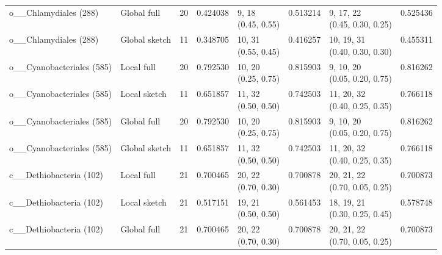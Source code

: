 \begin{longtable}{lllr lrlr}
o\_\_Chlamydiales (288) & Global full & 20 & 0.424038 & \shortstack[l]{9, 18\\(0.45, 0.55)} & 0.513214 & \shortstack[l]{9, 17, 22\\(0.45, 0.30, 0.25)} & 0.525436 \\
o\_\_Chlamydiales (288) & Global sketch & 11 & 0.348705 & \shortstack[l]{10, 31\\(0.55, 0.45)} & 0.416257 & \shortstack[l]{10, 19, 31\\(0.40, 0.30, 0.30)} & 0.455311 \\
o\_\_Cyanobacteriales (585) & Local full & 20 & 0.792530 & \shortstack[l]{10, 20\\(0.25, 0.75)} & 0.815903 & \shortstack[l]{9, 10, 20\\(0.05, 0.20, 0.75)} & 0.816262 \\
o\_\_Cyanobacteriales (585) & Local sketch & 11 & 0.651857 & \shortstack[l]{11, 32\\(0.50, 0.50)} & 0.742503 & \shortstack[l]{11, 20, 32\\(0.40, 0.25, 0.35)} & 0.766118 \\
o\_\_Cyanobacteriales (585) & Global full & 20 & 0.792530 & \shortstack[l]{10, 20\\(0.25, 0.75)} & 0.815903 & \shortstack[l]{9, 10, 20\\(0.05, 0.20, 0.75)} & 0.816262 \\
o\_\_Cyanobacteriales (585) & Global sketch & 11 & 0.651857 & \shortstack[l]{11, 32\\(0.50, 0.50)} & 0.742503 & \shortstack[l]{11, 20, 32\\(0.40, 0.25, 0.35)} & 0.766118 \\
c\_\_Dethiobacteria (102) & Local full & 21 & 0.700465 & \shortstack[l]{20, 22\\(0.70, 0.30)} & 0.700878 & \shortstack[l]{20, 21, 22\\(0.70, 0.05, 0.25)} & 0.700873 \\
c\_\_Dethiobacteria (102) & Local sketch & 21 & 0.517151 & \shortstack[l]{19, 21\\(0.50, 0.50)} & 0.561453 & \shortstack[l]{18, 19, 21\\(0.30, 0.25, 0.45)} & 0.578748 \\
c\_\_Dethiobacteria (102) & Global full & 21 & 0.700465 & \shortstack[l]{20, 22\\(0.70, 0.30)} & 0.700878 & \shortstack[l]{20, 21, 22\\(0.70, 0.05, 0.25)} & 0.700873 \\

\end{longtable}
